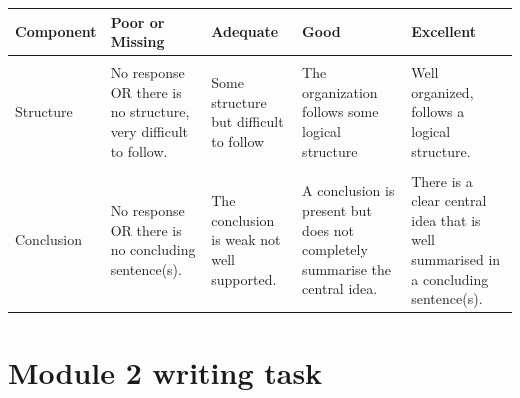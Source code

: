 \documentclass[
  openany]{book}
\begin{document}
\begin{table}
\centering\begingroup\fontsize{8}{10}\selectfont

\begin{tabular}{l>{\raggedright\arraybackslash}p{12em}>{\raggedright\arraybackslash}p{12em}>{\raggedright\arraybackslash}p{12em}>{\raggedright\arraybackslash}p{12em}}
\toprule
Component & Poor or Missing & Adequate & Good & Excellent\\
\midrule
\cellcolor{gray!6}{Addresses prompt} & \cellcolor{gray!6}{No response OR does not address one of the prompts for this week.} & \cellcolor{gray!6}{While the prompt is somewhat addressed, there is a lot missing and/or much of the response is not relevant/off-topic.} & \cellcolor{gray!6}{Prompt is addressed, though may go somewhat off-topic at points, or lacks some depth in its coverage.} & \cellcolor{gray!6}{Prompt is clearly and comprehensively addressed.}\\
Structure & No response OR there is no structure, very difficult to follow. & Some structure but difficult to follow & The organization follows some logical structure & Well organized, follows a logical structure.\\
\cellcolor{gray!6}{Writing mechanics} & \cellcolor{gray!6}{No response OR considerable writing and grammatical issues that completely obscure the meaning OR lots of slang and inappropriate word choice.} & \cellcolor{gray!6}{Multiple sections are difficult to read, but is otherwise understandable.} & \cellcolor{gray!6}{Slight difficulty in understanding one or two sections.} & \cellcolor{gray!6}{Can read and follow along with minimal effort. Some grammatical or word choice errors are allowable, but they must not obstruct meaning.}\\
Conclusion & No response OR there is no concluding sentence(s). & The conclusion is weak not well supported. & A conclusion is present but does not completely summarise the central idea. & There is a clear central idea that is well summarised in a concluding sentence(s).\\
\bottomrule
\end{tabular}
\endgroup{}
\end{table}

\hypertarget{module-2-writing-task}{%
\section{Module 2 writing task}\label{module-2-writing-task}}
\end{document}
